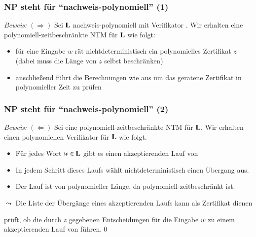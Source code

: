 \documentclass[aspectratio=1610,onlymath]{beamer}
\begin{document}
\begin{frame}[t]\frametitle{NP steht für "`nachweis-polynomiell"' (1)}

\medskip\pause

\emph{Beweis:}
$(\Rightarrow)$ Sei $\textbf{\textcolor{black}{L}}$ nachweis-polynomiell mit Verifikator . Wir erhalten eine polynomiell-zeitbeschränkte NTM  für $\textbf{\textcolor{black}{L}}$ wie folgt:\pause
\begin{itemize}
\item für eine Eingabe $w$ rät  nichtdeterministisch ein polynomielles Zertifikat $z$\\
(dabei muss  die Länge von $z$ selbst beschränken)
\item anschließend führt  die Berechnungen wie  aus um das geratene Zertifikat in polynomieller Zeit zu prüfen
\end{itemize}

\end{frame}

\begin{frame}[t]\frametitle{NP steht für "`nachweis-polynomiell"' (2)}

\medskip

\emph{Beweis:}
$(\Leftarrow)$ Sei  eine polynomiell-zeitbeschränkte NTM für $\textbf{\textcolor{black}{L}}$. Wir erhalten einen polynomiellen Verifikator  für $\textbf{\textcolor{black}{L}}$ wie folgt.\pause
% 
\begin{itemize}
\item Für jedes Wort $w\in\textbf{\textcolor{black}{L}}$ gibt es einen akzeptierenden Lauf von 
\item In jedem Schritt dieses Laufs wählt  nichtdeterministisch einen Übergang aus.
\item Der Lauf ist von polynomieller Länge, da  polynomiell-zeitbeschränkt ist.
\end{itemize}\pause
$\leadsto$ Die Liste der Übergänge eines akzeptierenden Laufs kann als Zertifikat dienen
\medskip

 prüft, ob die durch $z$ gegebenen Entscheidungen für die Eingabe $w$ zu einem akzeptierenden Lauf von  führen.\qed 

\end{frame}
\end{document}
